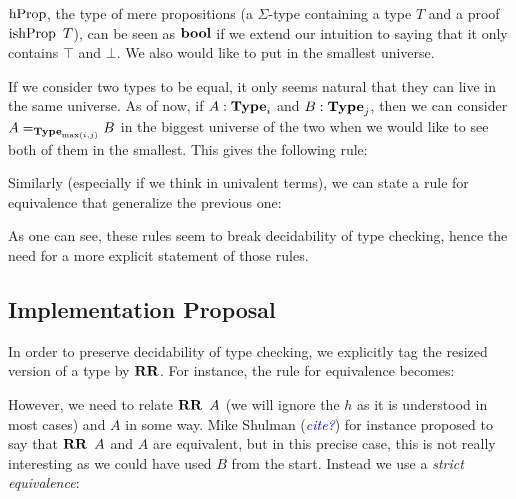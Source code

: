 \documentclass[11pt]{article}
\theoremstyle{plain}
\theoremstyle{remark}
\newcommand\meta[1]{\noindent\textcolor{blue}{\emph{#1}}}
\begin{document}
$\operatorname{hProp}$, the type of mere propositions (a $\Sigma$-type containing a type $T$
and a proof $\operatorname{ishProp}\ T$), can be seen as $\operatorname{\mathbf{bool}}$ if we extend our intuition
to saying that it only contains $\top$ and $\bot$. We also would like to put in
the smallest universe.

\begin{mathc}
\end{mathc}

If we consider two types to be equal, it only seems natural that they can live
in the same universe. As of now, if $A : \operatorname{\mathbf{Type}}_i$ and $B : \operatorname{\mathbf{Type}}_j$, then we
can consider $A =_{\operatorname{\mathbf{Type}}_{\max(i,j)}} B$ in the biggest universe of the two
when we would like to see both of them in the smallest.
This gives the following rule:

\begin{mathc}
\end{mathc}

Similarly (especially if we think in univalent terms), we can state a rule for
equivalence that generalize the previous one:

\begin{mathc}
\end{mathc}

As one can see, these rules seem to break decidability of type checking, hence
the need for a more explicit statement of those rules.


\subsection{Implementation Proposal}

In order to preserve decidability of type checking, we explicitly tag the
resized version of a type by $\operatorname{\mathbf{RR}}$. For instance, the rule for equivalence
becomes:

\begin{mathc}
\end{mathc}

\noindent
However, we need to relate $\operatorname{\mathbf{RR}}\ A$ (we will ignore the $h$ as it is understood
in most cases) and $A$ in some way. Mike Shulman (\meta{cite?}) for instance
proposed to say that $\operatorname{\mathbf{RR}}\ A$ and $A$ are equivalent, but in this precise case,
this is not really interesting as we could have used $B$ from the start.
Instead we use a \emph{strict equivalence}:
\end{document}
